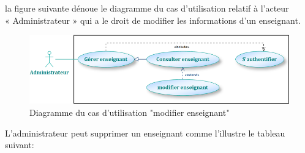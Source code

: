 \documentclass[12 pt ]{report}
\begin{document}
la figure suivante dénoue le diagramme du cas d’utilisation  relatif à l’acteur \\« Administrateur » qui a le droit de modifier les informations d'un enseignant.
\begin{figure}[h]
 \begin{center}
\includegraphics[width=13 cm ,height= 3.8 cm]{a6.PNG}
\caption{Diagramme du cas d’utilisation "modifier enseignant"}
\end{center}
\end{figure}
\newpage
L'administrateur peut supprimer un enseignant comme l’illustre le tableau suivant:
\end{document}
